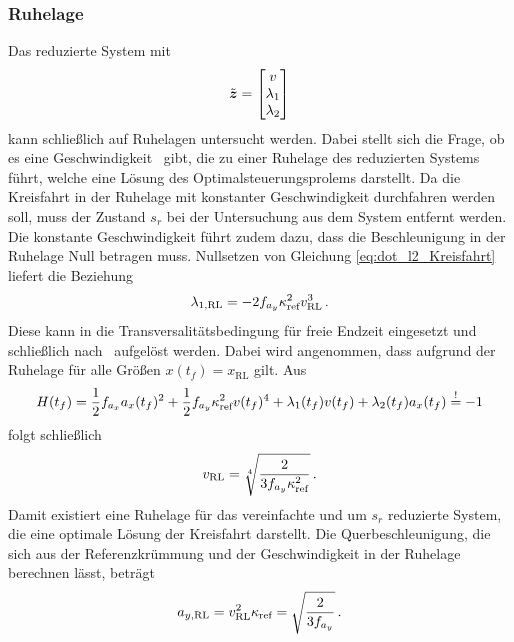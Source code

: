 \subsubsection{Ruhelage}\label{subsubsec:RL_ohne_Querdynamik}
Das reduzierte System mit 
\begin{equation}
\tilde{\boldsymbol{z}} = \begin{bmatrix}
v \\
\lambda_1 \\
\lambda_2
\end{bmatrix}
\end{equation}
kann schließlich auf Ruhelagen untersucht werden. Dabei stellt sich die Frage, ob es eine Geschwindigkeit \vRL~gibt, die zu einer Ruhelage des reduzierten Systems führt, welche eine Lösung des Optimalsteuerungsprolems darstellt. Da die Kreisfahrt in der Ruhelage mit konstanter Geschwindigkeit durchfahren werden soll, muss der Zustand $s_r$ bei der Untersuchung aus dem System entfernt werden. Die konstante Geschwindigkeit führt zudem dazu, dass die Beschleunigung in der Ruhelage Null betragen muss. Nullsetzen von Gleichung \eqref{eq:dot_l2_Kreisfahrt} liefert die Beziehung 
\begin{equation}
\lambda_{1,\textrm{RL}} = -2f_{a_y}\kappa_{\textrm{ref}}^2v_{\textrm{RL}}^3\,.
\end{equation}
Diese kann in die Transversalitätsbedingung für freie Endzeit eingesetzt und schließlich nach \vRL~aufgelöst werden. Dabei wird angenommen, dass aufgrund der Ruhelage für alle Größen $x(t_f) = x_\textrm{RL}$ gilt. Aus 
\begin{equation}
H(t_f) = \frac{1}{2}f_{a_x} a_x(t_f)^2 + \frac{1}{2}f_{a_y} \kappa_{\textrm{ref}}^2v(t_f)^4 + \lambda_1(t_f)v(t_f) + \lambda_2(t_f)a_x(t_f) \stackrel{!}{=} -1 
\end{equation}
folgt schließlich
\begin{equation}
v_{\textrm{RL}} = \sqrt[4]{\frac{2}{3f_{a_y}\kappa_{\textrm{ref}}^2}} \,.
\end{equation}
Damit existiert eine Ruhelage für das vereinfachte und um $s_r$ reduzierte System, die eine optimale Lösung der Kreisfahrt darstellt. Die Querbeschleunigung, die sich aus der Referenzkrümmung und der Geschwindigkeit in der Ruhelage berechnen lässt, beträgt
\begin{equation}
a_{y,\textrm{RL}} = v_{\textrm{RL}}^2\kappa_{\textrm{ref}} = \sqrt{\frac{2}{3f_{a_y}}} \,.
\end{equation}

